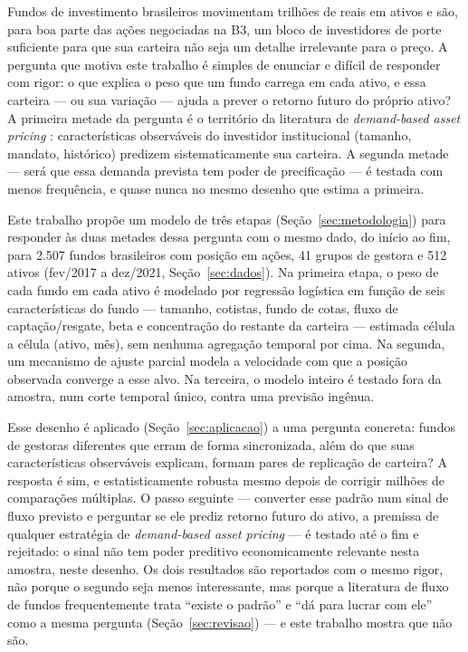 \documentclass[11pt,a4paper]{article}
\begin{document}
Fundos de investimento brasileiros movimentam trilhões de reais em ativos e são, para boa parte
das ações negociadas na B3, um bloco de investidores de porte suficiente para que sua carteira
não seja um detalhe irrelevante para o preço. A pergunta que motiva este trabalho é simples de
enunciar e difícil de responder com rigor: o que explica o peso que um fundo carrega em cada
ativo, e essa carteira --- ou sua variação --- ajuda a prever o retorno futuro do próprio ativo?
A primeira metade da pergunta é o território da literatura de \emph{demand-based asset pricing}
\cite{koijen2019}: características observáveis do investidor institucional (tamanho, mandato,
histórico) predizem sistematicamente sua carteira. A segunda metade --- será que essa demanda
prevista tem poder de precificação --- é testada com menos frequência, e quase nunca no mesmo
desenho que estima a primeira.

Este trabalho propõe um modelo de três etapas (Seção~\ref{sec:metodologia}) para responder às
duas metades dessa pergunta com o mesmo dado, do início ao fim, para 2.507 fundos brasileiros com
posição em ações, 41 grupos de gestora e 512 ativos (fev/2017 a dez/2021,
Seção~\ref{sec:dados}). Na primeira etapa, o peso de cada fundo em cada ativo é modelado
por regressão logística em função de seis características do fundo --- tamanho, cotistas, fundo
de cotas, fluxo de captação/resgate, beta e concentração do restante da carteira --- estimada
célula a célula (ativo, mês), sem nenhuma agregação temporal por cima. Na segunda, um mecanismo
de ajuste parcial modela a velocidade com que a posição observada converge a esse alvo. Na
terceira, o modelo inteiro é testado fora da amostra, num corte temporal único, contra uma
previsão ingênua.

Esse desenho é aplicado (Seção~\ref{sec:aplicacao}) a uma pergunta concreta: fundos de gestoras
diferentes que erram de forma sincronizada, além do que suas características observáveis
explicam, formam pares de replicação de carteira? A resposta é sim, e estatisticamente robusta
mesmo depois de corrigir milhões de comparações múltiplas. O passo seguinte --- converter esse
padrão num sinal de fluxo previsto e perguntar se ele prediz retorno futuro do ativo, a premissa
de qualquer estratégia de \emph{demand-based asset pricing} --- é testado até o fim e rejeitado:
o sinal não tem poder preditivo economicamente relevante nesta amostra, neste desenho. Os dois
resultados são reportados com o mesmo rigor, não porque o segundo seja menos interessante, mas
porque a literatura de fluxo de fundos frequentemente trata ``existe o padrão'' e ``dá para
lucrar com ele'' como a mesma pergunta (Seção~\ref{sec:revisao}) --- e este trabalho mostra que
não são.
\end{document}

